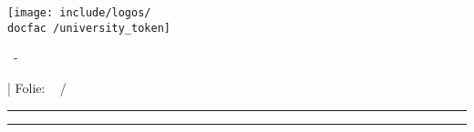 {
	\hspace*{0.02\textwidth}
	\begin{minipage}[m]{0.3\textwidth}
		\vspace*{3ex}
		\texttt{[image: include/logos/\\docfac /university\_token]}
	\end{minipage}
	\begin{minipage}[m]{0.45\textwidth}
		\vspace*{3ex}
		\doctitle ~- \\ \docsubtitle
	\end{minipage}
	\hfill
	\begin{minipage}[m]{0.14\textwidth}
		\vspace*{3ex}
		| Folie: \hfill \insertframenumber ~ / \inserttotalframenumber
		\hspace*{0.1\textwidth}
	\end{minipage}
	\color{\docfac }
	\rule{\paperwidth}{1pt}
}
%
%
%
{
	\color{\docfac }
	\rule{\paperwidth}{1pt}
	\color{black}
	\begin{minipage}[c]{\textwidth}
		\vspace*{1ex}
		\hspace*{0.02\textwidth} \docauthor \hfill \docdate \hspace{0.02\textwidth}
		\vspace*{2ex}
	\end{minipage}
}